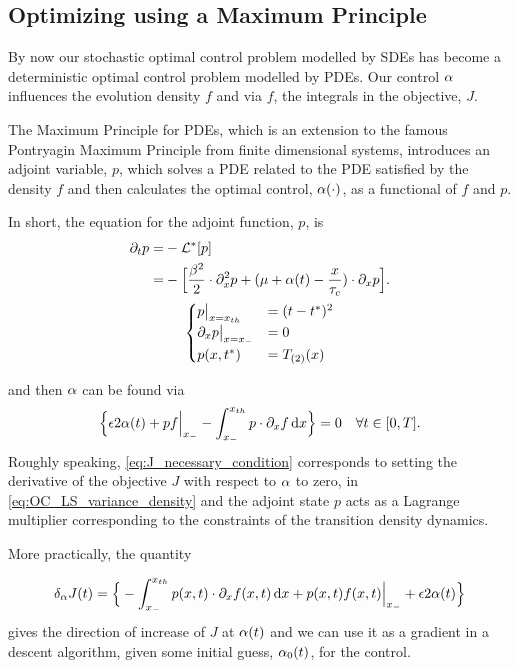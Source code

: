 \documentclass[12pt]{iopart}
\begin{document}
\subsection{Optimizing using a Maximum Principle}
\label{sec:PDE_max_principle_for_pdf}
By now our stochastic optimal control problem modelled by SDEs
has become a deterministic optimal control problem modelled by PDEs. Our control
${\alpha}$ influences the evolution density $f$ and via $f$, the integrals in the
objective, $J$.

The Maximum Principle for PDEs, which is an extension to the famous Pontryagin
Maximum Principle from finite dimensional systems, introduces an adjoint
variable, $p$, which solves a PDE related to the PDE satisfied by the density
$f$ and then calculates the optimal control, ${\alpha}(\cdot)$, as a functional of $f$
and $p$.

In short, the equation for the adjoint function, $p$, is
\begin{equation}
\begin{gathered}
\begin{aligned}
{\partial}_t p =& - { { \mathcal{L} }^* }[p]
\\
		=&
			- \Big[ \frac{{\beta}^2 }{2}\cdot {\partial}^2_x p +
			({\mu } + {\alpha}(t)- \frac{x}{{ \tau_{c} }})  \cdot {\partial}_x p \Big].
\end{aligned}
\\
\begin{cases}
	p \big|_{x={ x_{th} }} &= (t-{ t^* })^2
	\\
	{\partial}_x p  \big|_{x={ x_{-} }} &= 0
	\\
	p(x,{ t^* }) &= { {T}_{(2)} }(x)
\end{cases}
\label{eq:adjoint_pde_OU}
\end{gathered}
\end{equation}

and then ${\alpha}$ can be found via
\begin{equation}
\Big\{
 {\epsilon} 2 {\alpha}(t)
+ p f \Big|_{ x_{-} }
- \int _{ x_{-} }^{ x_{th} } p \cdot {\partial}_x f \, \mathrm{d} x
\Big\} = 0
\quad \forall t \in [0,T].
\label{eq:J_necessary_condition}
\end{equation}
Roughly speaking, \cref{eq:J_necessary_condition} corresponds to setting the
derivative of the objective $J$  with
respect to ${\alpha}$ to zero, in \cref{eq:OC_LS_variance_density} and the
adjoint state $p$ acts as a Lagrange multiplier corresponding to the constraints of
the transition density dynamics.

More practically, the quantity

\begin{equation}
\delta_{\alpha} J (t) =  \Big\{
- \int _{ x_{-} }^{ x_{th} } p(x,t) \cdot {\partial}_x f(x,t) \, \mathrm{d} x
+ p(x,t) f(x,t) \Big|_{ x_{-} }
+ {\epsilon}  2 {\alpha}(t)
\Big\}
\label{eq:hamiltonian_gradient}
\end{equation}
gives the direction of increase of $J$ at ${\alpha}(t)$
and we can use it as a gradient in a descent algorithm, given some initial
guess, ${\alpha}_0(t)$, for the control.
\end{document}
